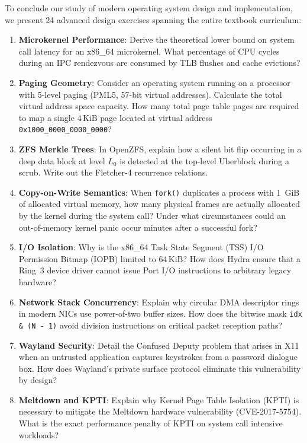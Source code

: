To conclude our study of modern operating system design and implementation, we present 24 advanced design exercises spanning the entire textbook curriculum:

\begin{enumerate}
    \item \textbf{Microkernel Performance}: Derive the theoretical lower bound on system call latency for an x86\_64 microkernel. What percentage of CPU cycles during an IPC rendezvous are consumed by TLB flushes and cache evictions?
    \item \textbf{Paging Geometry}: Consider an operating system running on a processor with 5-level paging (PML5, 57-bit virtual addresses). Calculate the total virtual address space capacity. How many total page table pages are required to map a single $4\,\text{KiB}$ page located at virtual address \texttt{0x1000\_0000\_0000\_0000}?
    \item \textbf{ZFS Merkle Trees}: In OpenZFS, explain how a silent bit flip occurring in a deep data block at level $L_0$ is detected at the top-level Uberblock during a scrub. Write out the Fletcher-4 recurrence relations.
    \item \textbf{Copy-on-Write Semantics}: When \texttt{fork()} duplicates a process with 1~GiB of allocated virtual memory, how many physical frames are actually allocated by the kernel during the system call? Under what circumstances could an out-of-memory kernel panic occur minutes after a successful fork?
    \item \textbf{I/O Isolation}: Why is the x86\_64 Task State Segment (TSS) I/O Permission Bitmap (IOPB) limited to $64\,\text{KiB}$? How does Hydra ensure that a Ring~3 device driver cannot issue Port I/O instructions to arbitrary legacy hardware?
    \item \textbf{Network Stack Concurrency}: Explain why circular DMA descriptor rings in modern NICs use power-of-two buffer sizes. How does the bitwise mask \texttt{idx \& (N - 1)} avoid division instructions on critical packet reception paths?
    \item \textbf{Wayland Security}: Detail the Confused Deputy problem that arises in X11 when an untrusted application captures keystrokes from a password dialogue box. How does Wayland's private surface protocol eliminate this vulnerability by design?
    \item \textbf{Meltdown and KPTI}: Explain why Kernel Page Table Isolation (KPTI) is necessary to mitigate the Meltdown hardware vulnerability (CVE-2017-5754). What is the exact performance penalty of KPTI on system call intensive workloads?

\end{enumerate}
